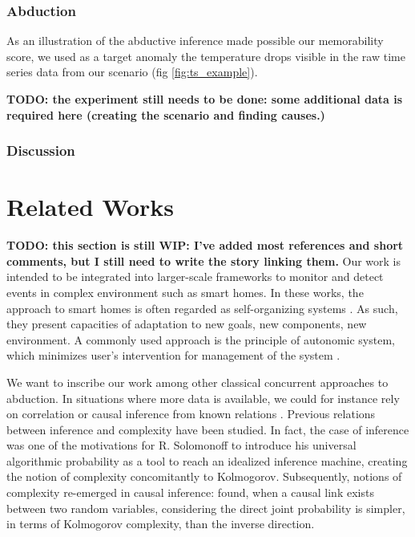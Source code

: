 \documentclass[conference]{IEEEtran}
\begin{document}
\subsubsection{Abduction}

As an illustration of the abductive inference made possible our memorability
score, we used as a target anomaly the temperature drops visible in the raw
time series data from our scenario (fig \ref{fig:ts_example}).

\textbf{TODO: the experiment still needs to be done: some additional data is required here (creating the scenario and finding causes.)}


\subsubsection{Discussion}
\label{ssub:discussion}

\section{Related Works}
\label{sec:related}
\textbf{TODO: this section is still WIP: I've added most references and short comments, but I still need to write the story linking them.}
Our work is intended to be integrated into larger-scale frameworks to monitor
and detect events in complex environment such as smart homes. In these works, the
approach to smart homes is often regarded as self-organizing systems \cite{kramer_rigorous_2009,kounev_notion_2017}. As such, they present capacities of adaptation to new goals,
new components, new environment. A commonly used approach is the principle of
autonomic system, which minimizes user's intervention for management of the
system \cite{kounev_notion_2017,kephart_vision_2003}.

We want to inscribe our work among other classical concurrent approaches to
abduction. In situations where more data is available, we could for instance rely
on correlation or causal inference from known relations \cite{peters_elements_2017,fadiga_or_2021}.
Previous relations between inference and complexity have been studied. In fact, the
case of inference was one of the motivations for R. Solomonoff to introduce his
universal algorithmic probability \cite{solomonoff_formal_1964} as a tool to
reach an idealized inference machine, creating the notion of complexity concomitantly
to Kolmogorov. Subsequently, notions of complexity re-emerged in causal inference:
\cite{janzing_causal_2010} found, when a causal link exists between two random variables,
considering the direct joint probability is simpler, in terms of Kolmogorov complexity,
than the inverse direction.
\end{document}
